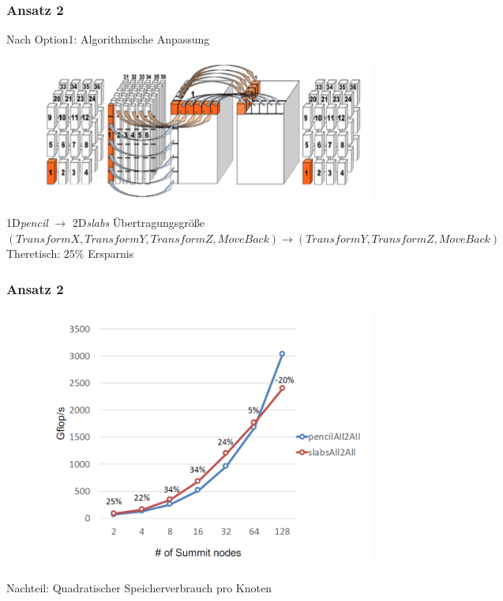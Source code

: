 \frame
{
	\frametitle{Ansatz 2}
	Nach Option1: Algorithmische Anpassung
	\begin{figure}[h!]
		\centering
		\includegraphics[width=0.7\linewidth, keepaspectratio]{../res/algo.png}
	\end{figure}
	1D\textit{pencil} $\rightarrow$ 2D\textit{slabs} Übertragungsgröße
	$(TransformX,TransformY,TransformZ,MoveBack)\rightarrow(TransformY,TransformZ,MoveBack)$
	Theretisch: $25\%$ Ersparnis
}

\frame
{
	\frametitle{Ansatz 2}
	\begin{figure}[h!]
		\centering
		\includegraphics[width=0.7\linewidth, keepaspectratio]{./res/bench2.png}
	\end{figure}
	Nachteil: Quadratischer Speicherverbrauch pro Knoten
}
